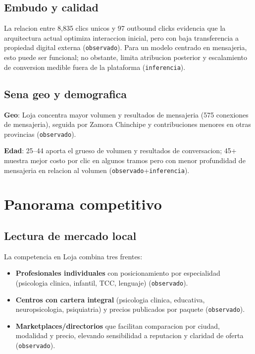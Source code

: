 \documentclass[9pt,a4paper,twocolumn,twoside]{tau-class/tau}
\begin{document}
\subsection{Embudo y calidad}
La relacion entre 8{,}835 clics unicos y 97 outbound clicks evidencia que la arquitectura actual optimiza interaccion inicial, pero con baja transferencia a propiedad digital externa (\texttt{observado}). Para un modelo centrado en mensajeria, esto puede ser funcional; no obstante, limita atribucion posterior y escalamiento de conversion medible fuera de la plataforma (\texttt{inferencia}).

\subsection{Sena geo y demografica}
\textbf{Geo}: Loja concentra mayor volumen y resultados de mensajeria (575 conexiones de mensajeria), seguida por Zamora Chinchipe y contribuciones menores en otras provincias (\texttt{observado}).

\textbf{Edad}: 25--44 aporta el grueso de volumen y resultados de conversacion; 45+ muestra mejor costo por clic en algunos tramos pero con menor profundidad de mensajeria en relacion al volumen (\texttt{observado}+\texttt{inferencia}).

\section{Panorama competitivo}

\subsection{Lectura de mercado local}
La competencia en Loja combina tres frentes:
\begin{itemize}
  \item \textbf{Profesionales individuales} con posicionamiento por especialidad (psicologia clinica, infantil, TCC, lenguaje) (\texttt{observado}).
  \item \textbf{Centros con cartera integral} (psicologia clinica, educativa, neuropsicologia, psiquiatria) y precios publicados por paquete (\texttt{observado}).
  \item \textbf{Marketplaces/directorios} que facilitan comparacion por ciudad, modalidad y precio, elevando sensibilidad a reputacion y claridad de oferta (\texttt{observado}).
\end{itemize}
\end{document}
